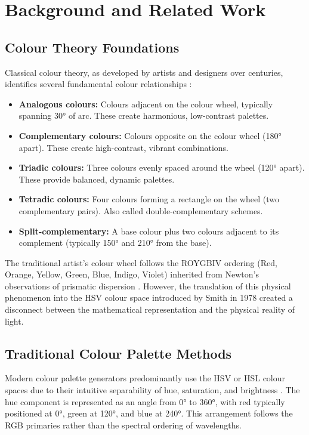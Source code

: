 \documentclass[12pt,a4paper]{article}
\begin{document}
\section{Background and Related Work}
\label{sec:background}

\subsection{Colour Theory Foundations}

Classical colour theory, as developed by artists and designers over centuries, identifies several fundamental colour relationships \cite{itten1961art,albers2013interaction}:

\begin{itemize}
\item \textbf{Analogous colours:} Colours adjacent on the colour wheel, typically spanning 30° of arc. These create harmonious, low-contrast palettes.
\item \textbf{Complementary colours:} Colours opposite on the colour wheel (180° apart). These create high-contrast, vibrant combinations.
\item \textbf{Triadic colours:} Three colours evenly spaced around the wheel (120° apart). These provide balanced, dynamic palettes.
\item \textbf{Tetradic colours:} Four colours forming a rectangle on the wheel (two complementary pairs). Also called double-complementary schemes.
\item \textbf{Split-complementary:} A base colour plus two colours adjacent to its complement (typically 150° and 210° from the base).
\end{itemize}

The traditional artist's colour wheel follows the ROYGBIV ordering (Red, Orange, Yellow, Green, Blue, Indigo, Violet) inherited from Newton's observations of prismatic dispersion \cite{newton1704opticks}. However, the translation of this physical phenomenon into the HSV colour space introduced by Smith in 1978 \cite{smith1978color} created a disconnect between the mathematical representation and the physical reality of light.

\subsection{Traditional Colour Palette Methods}

Modern colour palette generators predominantly use the HSV or HSL colour spaces due to their intuitive separability of hue, saturation, and brightness \cite{joblove1978color}. The hue component is represented as an angle from 0° to 360°, with red typically positioned at 0°, green at 120°, and blue at 240°. This arrangement follows the RGB primaries rather than the spectral ordering of wavelengths.
\end{document}
